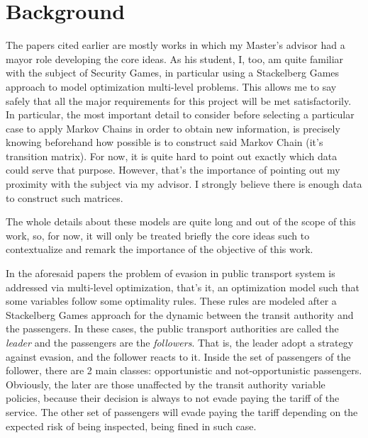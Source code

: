 \documentclass[10pt,letterpaper]{article}
\begin{document}
\section*{Background}
The papers cited earlier are mostly works in which my Master's advisor had a mayor role developing the core ideas. As his student, I, too, am quite familiar with the subject of Security Games, in particular using a Stackelberg Games approach to model optimization multi-level problems. This allows me to say safely that all the major requirements for this project will be met satisfactorily. In particular, the most important detail to consider before selecting a particular case to apply Markov Chains in order to obtain new information, is precisely knowing beforehand how possible is to construct said Markov Chain (it's transition matrix). For now, it is quite hard to point out exactly which data could serve that purpose. However, that's the importance of pointing out my proximity with the subject via my advisor. I strongly believe there is enough data to construct such matrices.\par
The whole details about these models are quite long and out of the scope of this work, so, for now, it will only be treated briefly the core ideas such to contextualize and remark the importance of the objective of this work.\par
In the aforesaid papers the problem of evasion in public transport system is addressed via multi-level optimization, that's it, an optimization model such that some variables follow some optimality rules. These rules are modeled after a Stackelberg Games approach for the dynamic between the transit authority and the passengers. In these cases, the public transport authorities are called the \textit{leader} and the passengers are the \textit{followers}. That is, the leader adopt a strategy against evasion, and the follower reacts to it. Inside the set of passengers of the follower, there are 2 main classes: opportunistic and not-opportunistic passengers. Obviously, the later are those unaffected by the transit authority variable policies, because their decision is always to not evade paying the tariff of the service. The other set of passengers will evade paying the tariff depending on the expected risk of being inspected, being fined in such case.\par
\end{document}

